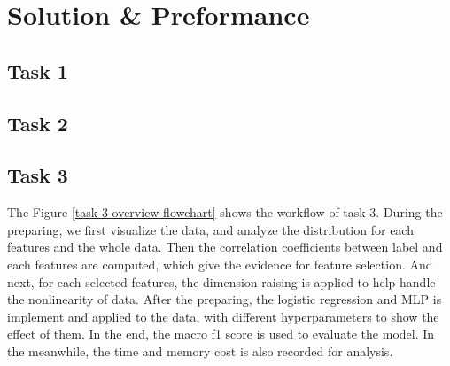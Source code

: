 \documentclass[11pt]{article}
\begin{document}
\section{Solution \& Preformance}

\subsection{Task 1}

\subsection{Task 2}

\subsection{Task 3}

The Figure \ref{task-3-overview-flowchart} shows the workflow of task 3. During the preparing, we first visualize the data, and analyze the distribution for each features and the whole data. Then the correlation coefficients between label and each features are computed, which give the evidence for feature selection. And next, for each selected features, the dimension raising is applied to help handle the nonlinearity of data. After the preparing, the logistic regression and MLP is implement and applied to the data, with different hyperparameters to show the effect of them. In the end, the macro f1 score is used to evaluate the model. In the meanwhile, the time and memory cost is also recorded for analysis.
\end{document}
